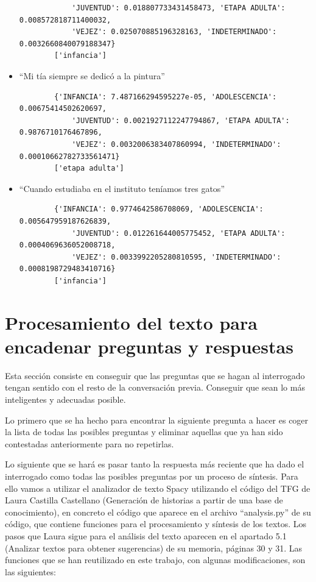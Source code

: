 \begin{itemize}
\begin{verbatim}
			'JUVENTUD': 0.018807733431458473, 'ETAPA ADULTA': 0.008572818711400032, 
			'VEJEZ': 0.025070885196328163, 'INDETERMINADO': 0.0032660840079188347}
		['infancia']
	\end{verbatim}
	\item ``Mi tía siempre se dedicó a la pintura''
	\begin{verbatim}
		{'INFANCIA': 7.487166294595227e-05, 'ADOLESCENCIA': 0.00675414502620697, 
			'JUVENTUD': 0.0021927112247794867, 'ETAPA ADULTA': 0.9876710176467896, 
			'VEJEZ': 0.0032006383407860994, 'INDETERMINADO': 0.00010662782733561471}
		['etapa adulta']
	\end{verbatim}
	\item ``Cuando estudiaba en el instituto teníamos tres gatos''
	\begin{verbatim}
		{'INFANCIA': 0.9774642586708069, 'ADOLESCENCIA': 0.005647959187626839, 
			'JUVENTUD': 0.012261644005775452, 'ETAPA ADULTA': 0.0004069636052008718, 
			'VEJEZ': 0.0033992205280810595, 'INDETERMINADO': 0.0008198729483410716}
		['infancia']
	\end{verbatim}
	
\end{itemize}



\section{Procesamiento del texto para encadenar preguntas y respuestas} \label{procesamiento}
 
Esta sección consiste en conseguir que las preguntas que se hagan al interrogado tengan sentido con el resto de la conversación previa. Conseguir que sean lo más inteligentes y adecuadas posible. 

Lo primero que se ha hecho para encontrar la siguiente pregunta a hacer es coger la lista de todas las posibles preguntas y eliminar aquellas que ya han sido contestadas anteriormente para no repetirlas. 

Lo siguiente que se hará es pasar tanto la respuesta más reciente que ha dado el interrogado como todas las posibles preguntas por un proceso de síntesis. Para ello vamos a utilizar el analizador de texto Spacy utilizando el código del TFG de Laura Castilla Castellano (Generación de historias a partir de una base de conocimiento), en concreto el código que aparece en el archivo ``analysis.py'' de su código, que contiene funciones para el procesamiento y síntesis de los textos. Los pasos que Laura sigue para el análisis del texto aparecen en el apartado 5.1 (Analizar textos para obtener sugerencias) de su memoria, páginas 30 y 31. Las funciones que se han reutilizado en este trabajo, con algunas modificaciones, son las siguientes:

